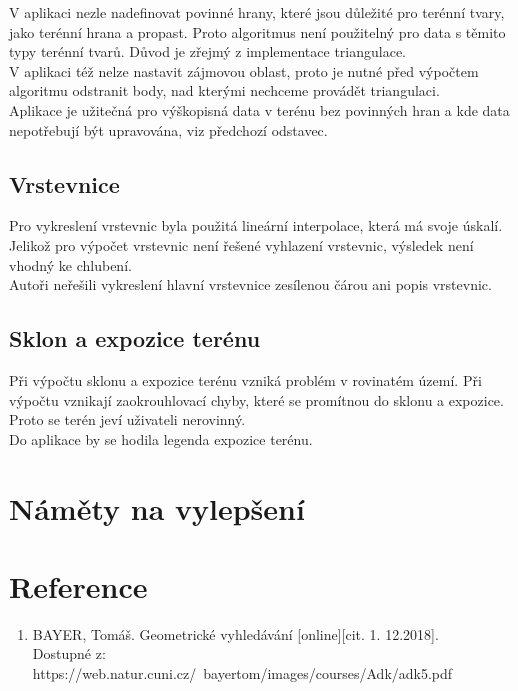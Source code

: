 \documentclass[a4paper, 12pt]{article}
\begin{document}
V aplikaci nezle nadefinovat povinné hrany, které jsou důležité pro terénní tvary, jako terénní hrana a propast. Proto algoritmus není použitelný pro data s těmito typy terénní tvarů. Důvod je zřejmý z implementace triangulace.\\

V aplikaci též nelze nastavit zájmovou oblast, proto je nutné před výpočtem algoritmu odstranit body, nad kterými nechceme provádět triangulaci.\\

Aplikace je užitečná pro výškopisná data v terénu bez povinných hran a kde data nepotřebují být upravována, viz předchozí odstavec. \\

\subsection{Vrstevnice}
Pro vykreslení vrstevnic byla použitá lineární interpolace, která má svoje úskalí. Jelikož pro výpočet vrstevnic není řešené vyhlazení vrstevnic, výsledek není vhodný ke chlubení.\\

Autoři neřešili vykreslení hlavní vrstevnice zesílenou čárou ani popis vrstevnic. \\

\subsection{Sklon a expozice terénu}
Při výpočtu sklonu a expozice terénu vzniká problém v rovinatém území. Při výpočtu vznikají zaokrouhlovací chyby, které se promítnou do sklonu a expozice. Proto se terén jeví uživateli nerovinný.\\

Do aplikace by se hodila legenda expozice terénu.\\

\section{Náměty na vylepšení}



\clearpage
\section{Reference}

\begin{enumerate}
\item  BAYER, Tomáš. Geometrické vyhledávání [online][cit. 1. 12.2018]. \\
Dostupné z: https://web.natur.cuni.cz/~bayertom/images/courses/Adk/adk5.pdf  \\




\end{enumerate}
\end{document}
